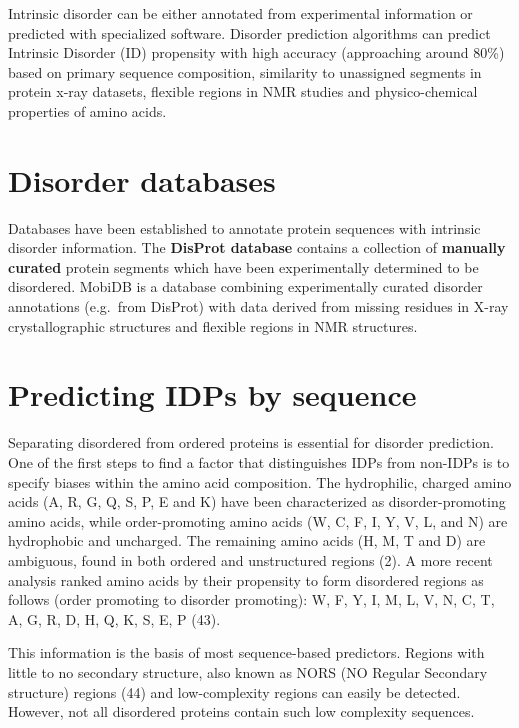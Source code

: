 \documentclass[
]{book}
\begin{document}
Intrinsic disorder can be either annotated from experimental information or predicted with specialized software. Disorder prediction algorithms can predict Intrinsic Disorder (ID) propensity with high accuracy (approaching around 80\%) based on primary sequence composition, similarity to unassigned segments in protein x-ray datasets, flexible regions in NMR studies and physico-chemical properties of amino acids.

\hypertarget{disorder-databases}{%
\section{Disorder databases}\label{disorder-databases}}

Databases have been established to annotate protein sequences with intrinsic disorder information. The \textbf{DisProt database} contains a collection of \textbf{manually curated} protein segments which have been experimentally determined to be disordered. MobiDB is a database combining experimentally curated disorder annotations (e.g.~from DisProt) with data derived from missing residues in X-ray crystallographic structures and flexible regions in NMR structures.

\hypertarget{predicting-idps-by-sequence}{%
\section{Predicting IDPs by sequence}\label{predicting-idps-by-sequence}}

Separating disordered from ordered proteins is essential for disorder prediction. One of the first steps to find a factor that distinguishes IDPs from non-IDPs is to specify biases within the amino acid composition. The hydrophilic, charged amino acids (A, R, G, Q, S, P, E and K) have been characterized as disorder-promoting amino acids, while order-promoting amino acids (W, C, F, I, Y, V, L, and N) are hydrophobic and uncharged. The remaining amino acids (H, M, T and D) are ambiguous, found in both ordered and unstructured regions (2). A more recent analysis ranked amino acids by their propensity to form disordered regions as follows (order promoting to disorder promoting): W, F, Y, I, M, L, V, N, C, T, A, G, R, D, H, Q, K, S, E, P (43).

This information is the basis of most sequence-based predictors. Regions with little to no secondary structure, also known as NORS (NO Regular Secondary structure) regions (44) and low-complexity regions can easily be detected. However, not all disordered proteins contain such low complexity sequences.
\end{document}
